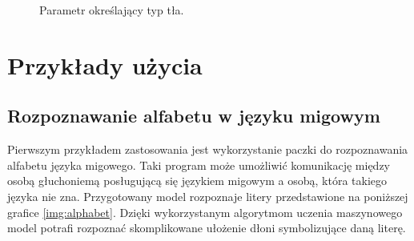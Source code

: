 \begin{figure}[H]
    \centering
    \hfill
    \caption{Parametr określający typ tła.}
\end{figure}

\newpage
\section{Przykłady użycia}
\subsection{Rozpoznawanie alfabetu w języku migowym}
\quad Pierwszym przykładem zastosowania jest wykorzystanie paczki do rozpoznawania alfabetu języka migowego. Taki program może umożliwić komunikację między osobą głuchoniemą posługującą się językiem migowym a osobą, która takiego języka nie zna. Przygotowany model rozpoznaje litery przedstawione na poniższej grafice \ref{img:alphabet}. Dzięki wykorzystanym algorytmom uczenia maszynowego model potrafi rozpoznać skomplikowane ułożenie dłoni symbolizujące daną literę.  


